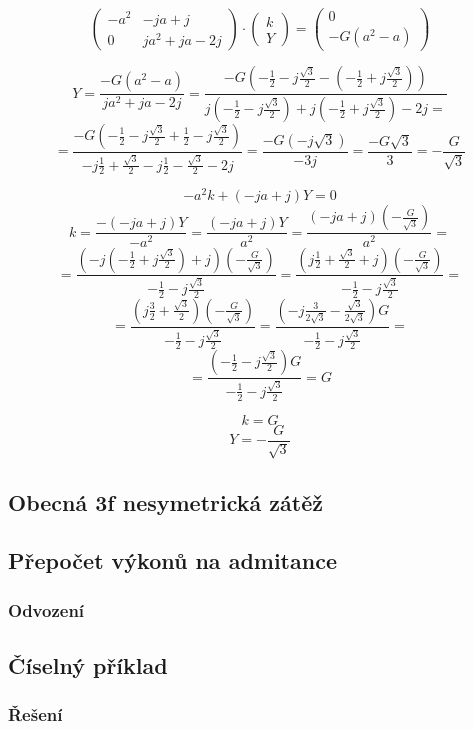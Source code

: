 \documentclass{article}
\begin{document}
$$
    \begin{pmatrix}
        -a^2 & - j a + j         \\
        0    & j a^2 + j a - 2 j
    \end{pmatrix}
    \cdot
    \begin{pmatrix}
        k \\
        Y
    \end{pmatrix}
    =
    \begin{pmatrix}
        0 \\
        - G (a^2 - a)
    \end{pmatrix}
$$

$$
    Y = \frac{- G (a^2 - a)}{j a^2 + j a - 2 j} = \frac{
        - G \left( -\frac{1}{2} - j \frac{\sqrt{3}}{2} - \left( -\frac{1}{2} + j \frac{\sqrt{3}}{2} \right) \right)
    }{
        j \left( -\frac{1}{2} - j \frac{\sqrt{3}}{2} \right) + j \left( -\frac{1}{2} + j \frac{\sqrt{3}}{2} \right) - 2 j =
    }
$$
$$
    = \frac{
        - G \left( -\frac{1}{2} - j \frac{\sqrt{3}}{2} + \frac{1}{2} - j \frac{\sqrt{3}}{2} \right)
    }{
        -j \frac{1}{2} + \frac{\sqrt{3}}{2} - j \frac{1}{2} - \frac{\sqrt{3}}{2} - 2 j
    } = \frac{
        - G \left( -j \sqrt{3} \right)
    }{
        -3 j
    } = \frac{- G \sqrt{3}}{3} = -\frac{G}{\sqrt{3}}
$$

$$
    -a^2 k + (-j a + j) Y = 0
$$
$$
    k = \frac{- (-j a + j) Y}{-a^2} = \frac{(-j a + j) Y}{a^2} = \frac{(-j a + j) \left( -\frac{G}{\sqrt{3}} \right)}{a^2} =
$$
$$
    = \frac{
        \left( -j \left( -\frac{1}{2} + j \frac{\sqrt{3}}{2} \right) + j \right) \left( -\frac{G}{\sqrt{3}} \right)
    }{
        -\frac{1}{2} - j \frac{\sqrt{3}}{2}
    } = \frac{
        \left( j \frac{1}{2} + \frac{\sqrt{3}}{2} + j \right) \left( -\frac{G}{\sqrt{3}} \right)
    }{
        -\frac{1}{2} - j \frac{\sqrt{3}}{2}
    } =
$$
$$
    = \frac{
        \left( j \frac{3}{2} + \frac{\sqrt{3}}{2} \right) \left( -\frac{G}{\sqrt{3}} \right)
    }{
        -\frac{1}{2} - j \frac{\sqrt{3}}{2}
    } = \frac{
        \left( - j \frac{3}{2 \sqrt{3}} - \frac{\sqrt{3}}{2 \sqrt{3}} \right) G
    }{
        -\frac{1}{2} - j \frac{\sqrt{3}}{2}
    } =
$$
$$
    = \frac{
        \left( -\frac{1}{2} - j \frac{\sqrt{3}}{2} \right) G
    }{
        -\frac{1}{2} - j \frac{\sqrt{3}}{2}
    } = G
$$

$$
    k = G
$$
$$
    Y = -\frac{G}{\sqrt{3}}
$$


\subsection{Obecná 3f nesymetrická zátěž \spicy \spicy \spicy}


\subsection{Přepočet výkonů na admitance}

\subsubsection{Odvození \spicy \spicy \spicy}




\subsection{Číselný příklad}

\subsubsection{Řešení}
\end{document}
